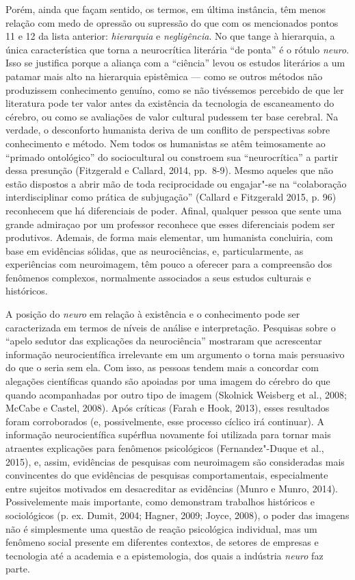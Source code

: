 Porém, ainda que façam sentido, os termos, em última instância, têm menos
relação com medo de opressão ou supressão do que com os mencionados
pontos 11 e 12 da lista anterior: \emph{hierarquia} e
\emph{negligência}. No que tange à hierarquia, a única característica
que torna a neurocrítica literária ``de ponta'' é o rótulo \emph{neuro}.
Isso se justifica porque a aliança com a ``ciência'' levou os estudos
literários a um patamar mais alto na hierarquia epistêmica --- como se
outros métodos não produzissem conhecimento genuíno, como se não
tivéssemos percebido de que ler literatura pode ter valor antes da
existência da tecnologia de escaneamento do cérebro, ou como se
avaliações de valor cultural pudessem ter base cerebral. Na verdade, o
desconforto humanista deriva de um conflito de perspectivas sobre
conhecimento e método. Nem todos os humanistas se atêm teimosamente ao
``primado ontológico'' do sociocultural ou constroem sua
``neurocrítica'' a partir dessa presunção (Fitzgerald e Callard, 2014,
pp.~8-9). Mesmo aqueles que não estão dispostos a abrir mão de toda
reciprocidade ou engajar"-se na ``colaboração interdisciplinar como
prática de subjugação'' (Callard e Fitzgerald 2015, p. 96) reconhecem
que há diferenciais de poder. Afinal, qualquer pessoa que sente uma
grande admiraçao por um professor reconhece que esses diferenciais podem
ser produtivos. Ademais, de forma mais elementar, um humanista
concluiria, com base em evidências sólidas, que as neurociências, e,
particularmente, as experiências com neuroimagem, têm pouco a oferecer
para a compreensão dos fenômenos complexos, normalmente associados a
seus estudos culturais e históricos.

A posição do \emph{neuro} em relação à existência e o conhecimento pode
ser caracterizada em termos de níveis de análise e interpretação.
Pesquisas sobre o ``apelo sedutor das explicações da neurociência''
mostraram que acrescentar informação neurocientífica irrelevante em um
argumento o torna mais persuasivo do que o seria sem ela. Com isso, as
pessoas tendem mais a concordar com alegações científicas quando são
apoiadas por uma imagem do cérebro do que quando acompanhadas por outro
tipo de imagem (Skolnick Weisberg et al., 2008; McCabe e Castel, 2008).
Após críticas (Farah e Hook, 2013), esses resultados foram corroborados
(e, possivelmente, esse processo cíclico irá continuar). A informação
neurocientífica supérflua novamente foi utilizada para tornar mais
atraentes explicações para fenômenos psicológicos (Fernandez"-Duque et
al., 2015), e, assim, evidências de pesquisas com neuroimagem são
consideradas mais convincentes do que evidências de pesquisas
comportamentais, especialmente entre sujeitos motivados em desacreditar
as evidências (Munro e Munro, 2014). Possivelemente mais importante,
como demonstram trabalhos históricos e sociológicos (p. ex. Dumit, 2004;
Hagner, 2009; Joyce, 2008), o poder das imagens não é simplesmente uma
questão de reação psicológica individual, mas um fenômeno social
presente em diferentes contextos, de setores de empresas e
tecnologia até a academia e a epistemologia, dos quais a indústria
\emph{neuro} faz parte.

